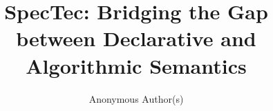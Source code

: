 \documentclass[acmsmall,review,screen]{acmart}
\begin{document}
\title{
SpecTec: Bridging the Gap between Declarative and Algorithmic Semantics
}

\author{Anonymous Author(s)}

%
%
%



%

\maketitle











\balance

\end{document}
